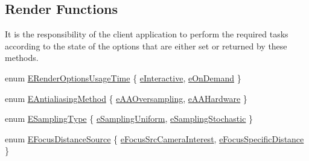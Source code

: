 \subsection*{Render Functions}
\label{_amgrp7033850ae43efdcc6099e5c3758519ab}%
It is the responsibility of the client application to perform the required tasks according to the state of the options that are either set or returned by these methods. \begin{DoxyCompactItemize}
\item 
enum \hyperlink{class_fbx_camera_ad95b8b85dc3f8ab08c8553a089555e1d}{E\+Render\+Options\+Usage\+Time} \{ \hyperlink{class_fbx_camera_ad95b8b85dc3f8ab08c8553a089555e1da0f386531c8e1ed0a92a12b809d5fa49c}{e\+Interactive}, 
\hyperlink{class_fbx_camera_ad95b8b85dc3f8ab08c8553a089555e1da86f4d6a5683101f25ba5efe735cb74c5}{e\+On\+Demand}
 \}
\item 
enum \hyperlink{class_fbx_camera_a44949ea304940f214a2f23a66dcbf45f}{E\+Antialiasing\+Method} \{ \hyperlink{class_fbx_camera_a44949ea304940f214a2f23a66dcbf45fad16b0e5227e11d234101b7dc1737f793}{e\+A\+A\+Oversampling}, 
\hyperlink{class_fbx_camera_a44949ea304940f214a2f23a66dcbf45fabc2e17294edd422f93f5732d8786ff43}{e\+A\+A\+Hardware}
 \}
\item 
enum \hyperlink{class_fbx_camera_aed549486ed0985230efca6fae0d731ae}{E\+Sampling\+Type} \{ \hyperlink{class_fbx_camera_aed549486ed0985230efca6fae0d731aea95d0fb02408eda0ecf4d8da0725134a8}{e\+Sampling\+Uniform}, 
\hyperlink{class_fbx_camera_aed549486ed0985230efca6fae0d731aea799fd52a0de2b544194395fa6b8f198a}{e\+Sampling\+Stochastic}
 \}
\item 
enum \hyperlink{class_fbx_camera_a1b50e7b2953019a40328599679071ad4}{E\+Focus\+Distance\+Source} \{ \hyperlink{class_fbx_camera_a1b50e7b2953019a40328599679071ad4a2063934bfeffc9520cda2fc76c07aac1}{e\+Focus\+Src\+Camera\+Interest}, 
\hyperlink{class_fbx_camera_a1b50e7b2953019a40328599679071ad4a81da6b77be08c0270652f6a23db4d77b}{e\+Focus\+Specific\+Distance}
 \}
\end{DoxyCompactItemize}
